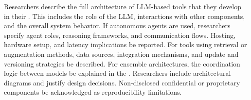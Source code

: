 Researchers \must describe the full architecture of LLM-based tools that they develop in their \paper. This includes the role of the LLM, interactions with other components, and the overall system behavior. If autonomous agents are used, researchers \must specify agent roles, reasoning frameworks, and communication flows. Hosting, hardware setup, and latency implications \must be reported. For tools using retrieval or augmentation methods, data sources, integration mechanisms, and update and versioning strategies \must be described. For ensemble architectures, the coordination logic between models \must be explained in the \paper. Researchers \should include architectural diagrams and justify design decisions. Non-disclosed confidential or proprietary components \must be acknowledged as reproducibility limitations.